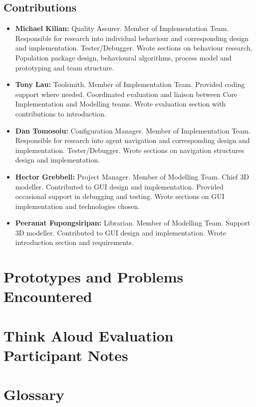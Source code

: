 \documentclass{l3proj}
\begin{document}
\section{Contributions}
\label{contributions}

\begin{itemize}
\item{\textbf{Michael Kilian:} Quality Assurer. Member of Implementation Team. Responsible for research into individual behaviour and corresponding design and implementation. Tester/Debugger. Wrote sections on behaviour research, Population package design, behavioural algorithms, process model and prototyping and team structure.}
\item{\textbf{Tony Lau:} Toolsmith. Member of Implementation Team. Provided coding support where needed. Coordinated evaluation and liaison between Core Implementation and Modelling teams. Wrote evaluation section with contributions to introduction. }
\item{\textbf{Dan Tomosoiu:} Configuration Manager. Member of Implementation Team. Responsible for research into agent navigation and corresponding design and implementation. Tester/Debugger. Wrote sections on navigation structures design and implementation.}
\item{\textbf{Hector Grebbell:} Project Manager. Member of Modelling Team. Chief 3D modeller. Contributed to GUI design and implementation. Provided occasional support in debugging and testing. Wrote sections on GUI implementation and technologies chosen.}
\item{\textbf{Peeranat Fupongsiripan:} Librarian. Member of Modelling Team. Support 3D modeller. Contributed to GUI design and implementation. Wrote introduction section and requirements. }
\end{itemize}

\clearpage
\appendix
{}


\chapter{Prototypes and Problems Encountered}


\chapter{Think Aloud Evaluation Participant Notes}



\chapter{Glossary}









\end{document}
